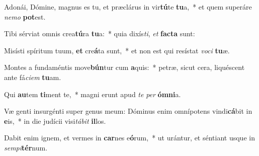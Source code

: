 \item Adonái, Dómine, magnus es tu, et præclárus in vir\textbf{tú}te \textbf{tu}a,~* et quem superáre \textit{ne}\textit{mo} \textbf{pot}est.
\item Tibi sérviat omnis crea\textbf{tú}ra \textbf{tu}a:~* quia dixís\textit{ti}, \textit{et} \textbf{fac}\textbf{ta} sunt:
\item Misísti spíritum tuum, \textbf{et} cre\textbf{á}ta sunt,~* et non est qui resístat \textit{vo}\textit{ci} \textbf{tu}æ.
\item Montes a fundaméntis move\textbf{bún}tur cum \textbf{a}quis:~* petræ, sicut cera, liquéscent ante fá\textit{ci}\textit{em} \textbf{tu}am.
\item Qui \textbf{au}tem \textbf{ti}ment te,~* magni erunt apud \textit{te} \textit{per} \textbf{óm}\textbf{ni}a.
\item Væ genti insurgénti super genus meum: Dóminus enim omnípotens vindi\textbf{cá}bit in \textbf{e}is,~* in die judícii visi\textit{tá}\textit{bit} \textbf{il}los.
\item Dabit enim ignem, et vermes in \textbf{car}nes e\textbf{ó}rum,~* ut urántur, et séntiant usque in \textit{sem}\textit{pi}\textbf{tér}num.
